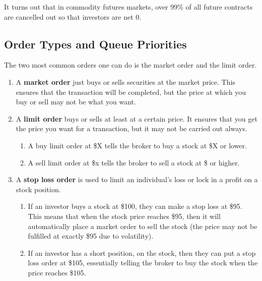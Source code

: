 \documentclass{article}
\begin{document}
    It turns out that in commodity futures markets, over 99\% of all future contracts are cancelled out so that investors are net $0$. 

  \subsection{Order Types and Queue Priorities}

    \begin{definition}
      \label{def:stock-orders}
      The two most common orders one can do is the market order and the limit order. 
      \begin{enumerate}
        \item A \textbf{market order} just buys or sells securities at the market price. This ensures that the transaction will be completed, but the price at which you buy or sell may not be what you want. 
        \item A \textbf{limit order} buys or sells at least at a certain price. It ensures that you get the price you want for a transaction, but it may not be carried out always. 
        \begin{enumerate}
          \item A buy limit order at \$X tells the broker to buy a stock at \$X or lower. 
          \item A sell limit order at \$x tells the broker to sell a stock at \$ or higher. 
        \end{enumerate}
        \item A \textbf{stop loss order} is used to limit an individual's loss or lock in a profit on a stock position. 
        \begin{enumerate}
          \item If an investor buys a stock at \$100, they can make a stop loss at \$95. This means that when the stock price reaches \$95, then it will automatically place a market order to sell the stock (the price may not be fulfilled at exactly \$95 due to volatility). 
          \item If an investor has a short position, on the stock, then they can put a stop loss order at \$105, essentially telling the broker to buy the stock when the price reaches \$105. 
        \end{enumerate}
      \end{enumerate}
    \end{definition}
\end{document}

